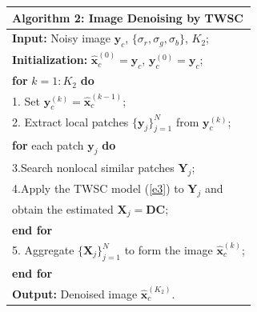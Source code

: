 \begin{table}[htb]
\begin{tabular}{l}
\hline
\textbf{Algorithm 2}: Image Denoising by TWSC
\\
\hline
\textbf{Input:} Noisy image $\bm{y}_{c}$, $\{\sigma_{r}, \sigma_{g}, \sigma_{b}\}$, $K_{2}$;
\\
\textbf{Initialization:} $\hat{\bm{x}}_{c}^{(0)}=\bm{y}_{c}$, $\bm{y}_{c}^{(0)}=\bm{y}_{c}$;
\\
\textbf{for} $k = 1:K_{2}$ \textbf{do}
\\
1. Set $\bm{y}_{c}^{(k)}=\hat{\bm{x}}_{c}^{(k-1)}$;
\\
2. Extract local patches $\{\bm{y}_{j}\}_{j=1}^{N}$ from $\bm{y}_{c}^{(k)}$;
\\
\quad\textbf{for} each patch $\bm{y}_{j}$ \textbf{do}
\\
3.\quad Search nonlocal similar patches $\bm{Y}_{j}$;
\\
4.\quad Apply the TWSC model (\ref{e3}) to $\bm{Y}_{j}$ and
\\
\quad \quad 
obtain the estimated $\bm{X}_{j}=\bm{D}\bm{C}$;
\\
\quad\textbf{end for}
\\
5. Aggregate $\{\bm{X}_{j}\}_{j=1}^{N}$ to form the image $\hat{\bm{x}}_{c}^{(k)}$;
\\
\textbf{end for}
\\
\textbf{Output:} Denoised image $\hat{\bm{x}}_{c}^{(K_{2})}$.
\\
\hline
\end{tabular}     
\end{table}

